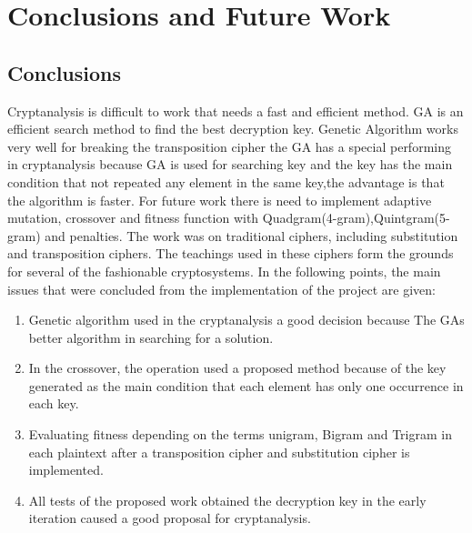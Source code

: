 \chapter{Conclusions and Future Work}
\section{Conclusions}
Cryptanalysis is difficult to work that needs a fast and efficient method.
GA is an efficient search method to find the best decryption key. Genetic Algorithm works very well for
breaking the transposition cipher the GA has a special performing in cryptanalysis because GA is used for searching key and the key has the main condition that not repeated any element in the same key,the advantage is that the algorithm is faster.
For future work there is need to
implement adaptive mutation, crossover
and fitness function with Quadgram(4-gram),Quintgram(5-gram) and penalties.
The work was on traditional ciphers, including substitution and transposition ciphers. The teachings used in these ciphers form the grounds for several of the fashionable cryptosystems.
In the following points, the main issues that were concluded from the
implementation of the project are given:
\begin{enumerate}
    \item{Genetic algorithm used in the cryptanalysis a good decision because The GAs better algorithm in searching for a solution.}
    \item {In the crossover, the operation used a proposed method because of the key generated as the main condition that each element has only one occurrence in each key.}
    \item { Evaluating fitness depending on the terms unigram, Bigram and Trigram in each plaintext after a transposition cipher and substitution cipher is implemented.}
    \item {All tests of the proposed work obtained the decryption key in the early iteration caused a good proposal for cryptanalysis.}

\end{enumerate}

